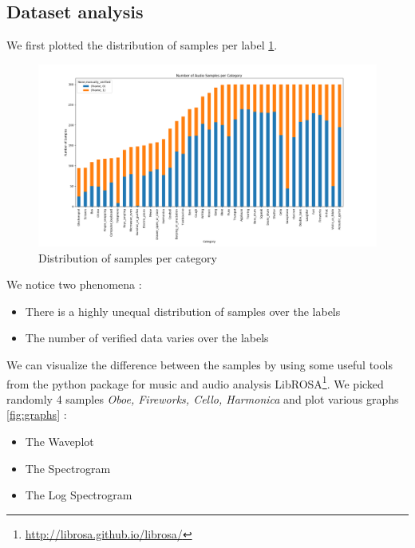 \documentclass{article} %
\begin{document}
	\subsection{Dataset analysis}
		We first plotted the distribution of samples per label \ref{fig:category_distribution}.
		\begin{figure}[H]
		  \includegraphics[width=\linewidth]{category_distribution.png}
		  \caption{Distribution of samples per category}
		  \label{fig:category_distribution}
		\end{figure}
		We notice two phenomena :
		\begin{itemize}
		    \item There is a highly unequal distribution of samples over the labels
		    \item The number of verified data varies over the labels
		\end{itemize}

		We can visualize the difference between the samples by using some useful tools from the python package for music and audio analysis LibROSA\footnote{\url{http://librosa.github.io/librosa/}}. We picked randomly 4 samples \emph{Oboe, Fireworks, Cello, Harmonica} and plot various graphs \ref{fig:graphs} :

		\begin{itemize}
		    \item The Waveplot
		    \item The Spectrogram
		    \item The Log Spectrogram
		\end{itemize}
\end{document}
